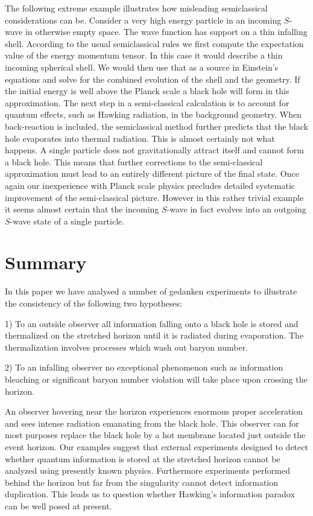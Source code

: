 The following extreme example illustrates how misleading
semiclassical considerations can be.  Consider a very high energy
particle in an incoming $S$-wave in otherwise empty space.  The wave
function has support on a thin infalling shell.  According to the
usual semiclassical rules we first compute the expectation value of
the energy momentum tensor.  In this case it would describe a thin
incoming spherical shell.  We would then use that as a source in
Einstein's equations and solve for the combined evolution of the
shell and the geometry.  If the initial energy is well above the
Planck scale a black hole will form in this approximation.  The next
step in a semi-classical calculation is to account for quantum
effects, such as Hawking radiation, in the background geometry.  When
back-reaction is included, the semiclassical method further predicts
that the black hole evaporates into thermal radiation.  This is
almost certainly not what happens.  A single particle does not
gravitationally attract itself and cannot form a black hole.  This
means that further corrections to the semi-classical approximation
must lead to an entirely different picture of the final state.  Once
again our inexperience with Planck scale physics precludes detailed
systematic improvement of the semi-classical picture.  However in
this rather trivial example it seems almost certain that the incoming
$S$-wave in fact evolves into an outgoing $S$-wave state of a single
particle.

\chapter{Summary}

In this paper we have analysed a number of gedanken experiments to
illustrate the consistency of the following two hypotheses:

1)  To an outside observer all information falling onto a black hole
is stored and thermalized on the stretched horizon until it is
radiated during evaporation.  The thermalization involves processes
which wash out baryon number.

2)  To an infalling observer no exceptional phenomenon such as
information bleaching or significant baryon number violation will
take place upon crossing the horizon.

An observer hovering near the horizon experiences enormous proper
acceleration and sees intense radiation emanating from the black
hole.  This observer can for most purposes replace the black hole by
a hot membrane located just outside the event horizon.  Our examples
suggest that external experiments designed to detect whether quantum
information is stored at the stretched horizon cannot be analyzed
using presently known physics.  Furthermore experiments performed
behind the horizon but far from the singularity cannot detect
information duplication.  This leads us to question whether Hawking's
information paradox can be well posed at present.

